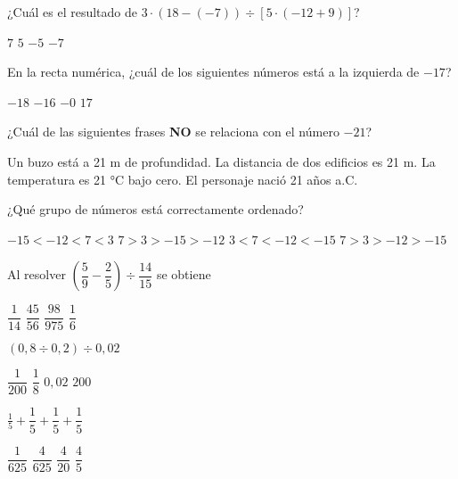 \documentclass[spanish,letterpaper, 12pt, addpoints, answers]{exam}
\begin{document}
\begin{questions}
    \question[1] ¿Cuál es el resultado de $3\cdot (18-(-7))\div \left[5\cdot (-12+9)\right]$?
    \begin{choices}
        \choice $7$
        \choice $5$
        \CorrectChoice $-5$
        \choice $-7$
    \end{choices}
    \vspace{0.15in}

    \question[1] En la recta numérica, ¿cuál de los siguientes números está a la izquierda de $-17$?
    \begin{choices}
        \CorrectChoice $-18$
        \choice $-16$
        \choice $-0$
        \choice $17$
    \end{choices}
    \vspace{0.15in}

    \question[1] ¿Cuál de las siguientes frases \textbf{NO} se relaciona con el número $-21$?
    \begin{choices}
        \choice Un buzo está a 21 m de profundidad.
        \CorrectChoice La distancia de dos edificios es 21 m.
        \choice La temperatura es 21 °C bajo cero.
        \choice El personaje nació 21 años a.C.
    \end{choices}
    \vspace{0.15in}

\newpage
    \question[1] ¿Qué grupo de números está correctamente ordenado?
    \begin{choices}
        \choice $-15<-12<7<3$
        \choice $7>3>-15>-12$
        \choice $3<7<-12<-15$
        \CorrectChoice $7>3>-12>-15$
    \end{choices}
    \vspace{0.15in}

    \question[1] Al resolver $\left(\dfrac{5}{9}-\dfrac{2}{5}\right)\div \dfrac{14}{15}$ se obtiene
    \begin{choices}
        \choice $\dfrac{1}{14}$
        \choice $\dfrac{45}{56}$
        \choice $\dfrac{98}{975}$
        \CorrectChoice $\dfrac{1}{6}$
    \end{choices}
    \vspace{0.15in}

    \question[1] $(0,8\div 0,2)\div 0,02$
    \begin{choices}
        \choice $\dfrac{1}{200}$
        \choice $\dfrac{1}{8}$
        \choice $0,02$
        \CorrectChoice $200$
    \end{choices}
    \vspace{0.15in}


    \question[1] $\frac{1}{5}+\dfrac{1}{5}+\dfrac{1}{5}+\dfrac{1}{5}$
    \begin{choices}
        \choice $\dfrac{1}{625}$
        \choice $\dfrac{4}{625}$
        \choice $\dfrac{4}{20}$
        \CorrectChoice $\dfrac{4}{5}$
    \end{choices}
    \vspace{0.15in}


\end{questions}
\end{document}
